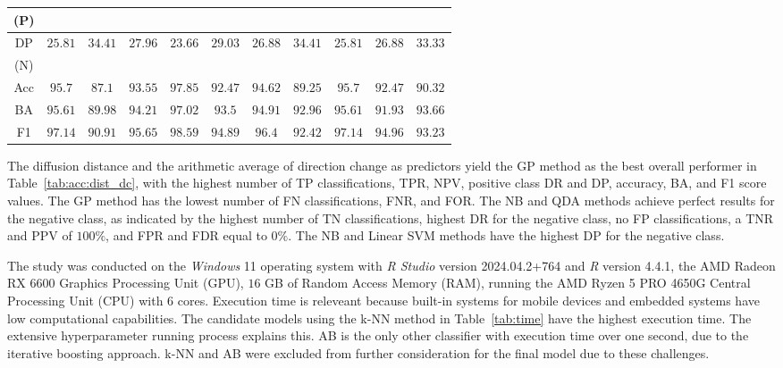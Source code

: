 \let\LaTeXcline\cline\documentclass[sn-mathphys-num]{sn-jnl}\let\cline\LaTeXcline
\begin{document}
\begin{table}[!ht]
\begin{tabular}{|c|c|c|c|c|c|c|c|c|c|c|}
        (P) & & & & & & & & & & \\ \hline
        DP & \multirow{2}{*}{$25.81$} & \multirow{2}{*}{$\mathbf{34.41}$} & \multirow{2}{*}{$27.96$} & \multirow{2}{*}{$23.66$} & \multirow{2}{*}{$29.03$} & \multirow{2}{*}{$26.88$} & \multirow{2}{*}{$\mathbf{34.41}$} & \multirow{2}{*}{$25.81$} & \multirow{2}{*}{$26.88$} & \multirow{2}{*}{$33.33$} \\     
        (N) & & & & & & & & & & \\ \hline
        Acc & $95.7$ & $87.1$ & $93.55$ & $\mathbf{97.85}$ & $92.47$ & $94.62$ & $89.25$ & $95.7$ & $92.47$ & $90.32$ \\ \hline
        BA & $95.61$ & $89.98$ & $94.21$ & $\mathbf{97.02}$ & $93.5$ & $94.91$ & $92.96$ & $95.61$ & $91.93$ & $93.66$ \\ \hline
        F1 & $97.14$ & $90.91$ & $95.65$ & $\mathbf{98.59}$ & $94.89$ & $96.4$ & $92.42$ & $97.14$ & $94.96$ & $93.23$ \\ \hline
	\end{tabular}
\end{table}

The diffusion distance and the arithmetic average of direction change as predictors yield the GP method as the best overall performer in Table~\ref{tab:acc:dist_dc}, with the highest number of TP classifications, TPR, NPV, positive class DR and DP, accuracy, BA, and F1 score values. The GP method has the lowest number of FN classifications, FNR, and FOR. The NB and QDA methods achieve perfect results for the negative class, as indicated by the highest number of TN classifications, highest DR for the negative class, no FP classifications, a TNR and PPV of $100\%$, and FPR and FDR equal to $0\%$. The NB and Linear SVM methods have the highest DP for the negative class.

The study was conducted on the \textit{Windows} 11 operating system with \textit{R Studio} version 2024.04.2+764 and \textit{R} version 4.4.1, the AMD Radeon RX 6600 Graphics Processing Unit (GPU), $16$ GB of Random Access Memory (RAM), running the AMD Ryzen 5 PRO 4650G Central Processing Unit (CPU) with $6$ cores. Execution time is releveant because built-in systems for mobile devices and embedded systems have low computational capabilities. The candidate models using the k-NN method in Table~\ref{tab:time} have the highest execution time. The extensive hyperparameter running process explains this. AB is the only other classifier with execution time over one second, due to the iterative boosting approach. k-NN and AB were excluded from further consideration for the final model due to these challenges.
\end{document}
